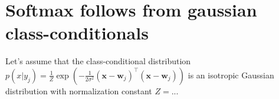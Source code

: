 \documentclass{esannV2}
\begin{document}
\appendix
\section{Softmax follows from gaussian class-conditionals}
Let's assume that the class-conditional distribution $p(x|y_j) = \frac{1}{Z} \exp(-\frac{1}{2\sigma^2}(\mathbf{x} - \mathbf{w}_j)^{\top}(\mathbf{x} - \mathbf{w}_j))$ is an isotropic Gaussian distribution with normalization constant $Z = ..$. 
\end{document}
